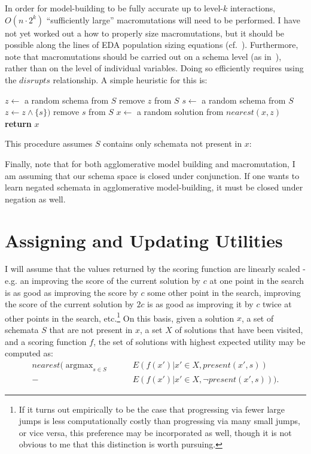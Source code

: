 \documentclass[letterpaper]{article}
\DeclareMathOperator*{\argmax}{argmax}
\begin{document}
In order for model-building to be fully accurate up to level-$k$ interactions,
$O(n \cdot 2^k)$ ``sufficiently large'' macromutations will need to be
performed. I have not yet worked out a how to properly size macromutations, but
it should be possible along the lines of EDA population sizing equations
(cf.~\cite{DOI}). Furthermore, note that macromutations should be carried out
on a schema level (as
in~\cite{CompetentMutation,CompetentMutation2,Iclanzan2}), rather than on the
level of individual variables. Doing so efficiently requires using the
$disrupts$ relationship. A simple heuristic for this is:
\begin{algorithmic}
  \State $z \leftarrow$ a random schema from $S$
  \State remove $z$ from $S$
    \State $s \leftarrow$ a random schema from $S$
      \State $z \leftarrow z \wedge \{s\})$
    \EndIf
    \State remove $s$ from $S$
    \State $x \leftarrow$ a random solution from $nearest(x,z)$
  \EndWhile
  \State \textbf{return} $x$
\EndProcedure
\end{algorithmic}
This procedure assumes $S$ contains only schemata not present in $x$:

Finally, note that for both agglomerative model building and macromutation, I
am assuming that our schema space is closed under conjunction. If one wants to
learn negated schemata in agglomerative model-building, it must be closed under
negation as well.

\section{Assigning and Updating Utilities}

I will assume that the values returned by the scoring function are linearly
scaled - e.g. an improving the score of the current solution by $c$ at one
point in the search is as good as improving the score by $c$ some other point
in the search, improving the score of the current solution by $2c$ is as good
as improving it by $c$ twice at other points in the search, etc.\footnote{If it
  turns out empirically to be the case that progressing via fewer large jumps
  is less computationally costly than progressing via many small jumps, or vice
  versa, this preference may be incorporated as well, though it is not obvious
  to me that this distinction is worth pursuing.}  On this basis, given a
solution $x$, a set of schemata $S$ that are not present in $x$, a set $X$ of
solutions that have been visited, and a scoring function $f$, the set of
solutions with highest expected utility may be computed as:
\begin{align}
nearest(\argmax_{s \in S} \qquad &E(f(x')|x' \in X, present(x',s)) \nonumber \\
                              - &E(f(x')|x' \in X, \neg present(x',s))) .
\end{align}
\end{document}
